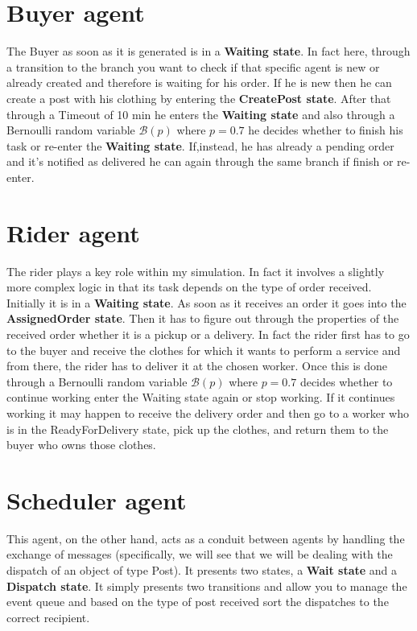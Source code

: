\section{Buyer agent}
The Buyer as soon as it is generated is in a \textbf{Waiting state}. In fact here, through a transition to the branch you want to check if that specific agent is new or already created and therefore is waiting for his order. If he is new then he can create a post with his clothing by entering the \textbf{CreatePost state}. After that through a Timeout of 10 min he enters the \textbf{Waiting state} and also through a Bernoulli random variable $\mathcal{B}(p)$ where $p = 0.7$ he decides whether to finish his task or re-enter the \textbf{Waiting state}. If,instead, he has already a pending order and it's notified as delivered he can again through the same branch if finish or re-enter.
\section{Rider agent}
The rider plays a key role within my simulation. In fact it involves a slightly more complex logic in that its task depends on the type of order received. Initially it is in a \textbf{Waiting state}. As soon as it receives an order it goes into the \textbf{AssignedOrder state}. Then it has to figure out through the properties of the received order whether it is a pickup or a delivery. In fact the rider first has to go to the buyer and receive the clothes for which it wants to perform a service and from there, the rider has to deliver it at the chosen worker. Once this is done through a Bernoulli random variable $\mathcal{B}(p)$ where $p = 0.7$ decides whether to continue working enter the Waiting state again or stop working. If it continues working it may happen to receive the delivery order and then go to a worker who is in the ReadyForDelivery state, pick up the clothes, and return them to the buyer who owns those clothes.
\section{Scheduler agent}
This agent, on the other hand, acts as a conduit between agents by handling the exchange of messages (specifically, we will see that we will be dealing with the dispatch of an object of type Post). It presents two states, a \textbf{Wait state} and a \textbf{Dispatch state}. It simply presents two transitions and allow you to manage the event queue and based on the type of post received sort the dispatches to the correct recipient.